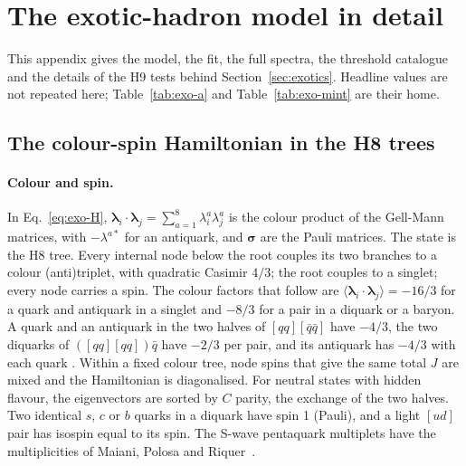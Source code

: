 \section{The exotic-hadron model in detail}\label{app:exotics}

This appendix gives the model, the fit, the full spectra, the threshold catalogue and the details of the H9 tests behind
Section~\ref{sec:exotics}. Headline values are not repeated here; Table~\ref{tab:exo-a} and Table~\ref{tab:exo-mint} are their home.

\subsection{The colour-spin Hamiltonian in the H8 trees}\label{app:exotics-model}

\paragraph{Colour and spin.} In Eq.~\eqref{eq:exo-H}, $\boldsymbol\lambda_i\!\cdot\!\boldsymbol\lambda_j=\sum_{a=1}^8\lambda^a_i
\lambda^a_j$ is the colour product of the Gell-Mann matrices, with $-\lambda^{a*}$ for an antiquark, and $\boldsymbol\sigma$ are the Pauli
matrices. The state is the H8 tree. Every internal node below the root couples its two branches to a colour (anti)triplet, with
quadratic Casimir $4/3$; the root couples to a singlet; every node carries a spin. The colour factors that follow are
$\langle\boldsymbol\lambda_i\!\cdot\!\boldsymbol\lambda_j\rangle=-16/3$ for a quark and antiquark in a singlet and $-8/3$ for a pair in
a diquark or a baryon. A quark and an antiquark in the two halves of $[qq][\bar q\bar q]$ have $-4/3$, the two diquarks of
$([qq][qq])\bar q$ have $-2/3$ per pair, and its antiquark has $-4/3$ with each quark . Within a fixed colour tree, node
spins that give the same total $J$ are mixed and the Hamiltonian is diagonalised. For neutral states with hidden flavour, the
eigenvectors are sorted by $C$ parity, the exchange of the two halves. Two identical $s$, $c$ or $b$ quarks in a diquark have spin 1
(Pauli), and a light $[ud]$ pair has isospin equal to its spin. The S-wave pentaquark multiplets have the multiplicities of Maiani, Polosa
and Riquer~\cite{maiani2015}.

